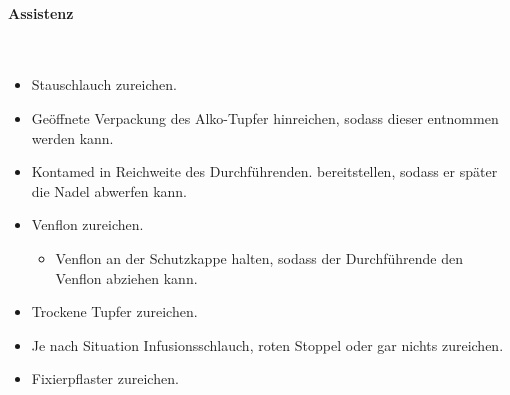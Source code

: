 \paragraph*{Assistenz}~


\begin{itemize}
    \item Stauschlauch zureichen.
    \item Geöffnete Verpackung des Alko-Tupfer hinreichen, sodass dieser
    entnommen werden kann.
    \item Kontamed in Reichweite des  Durchführenden.
    bereitstellen, sodass er später die Nadel abwerfen kann.
    \item Venflon zureichen.
\begin{itemize}
    \item Venflon an der Schutzkappe halten, sodass der
    Durchführende den Venflon abziehen kann.
\end{itemize}
    \item Trockene Tupfer zureichen.
    \item Je nach Situation Infusionsschlauch, roten Stoppel oder gar nichts
    zureichen.
    \item Fixierpflaster zureichen.
\end{itemize}





